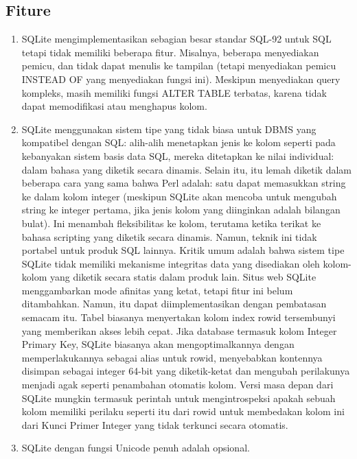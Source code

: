 	\subsection{Fiture}
		\begin{enumerate}
			\item SQLite mengimplementasikan sebagian besar standar SQL-92 untuk SQL tetapi tidak memiliki beberapa fitur. Misalnya, beberapa menyediakan pemicu, dan tidak dapat menulis ke tampilan (tetapi menyediakan pemicu INSTEAD OF yang menyediakan fungsi ini). Meskipun menyediakan query kompleks, masih memiliki fungsi ALTER TABLE terbatas, karena tidak dapat memodifikasi atau menghapus kolom.
			\item SQLite menggunakan sistem tipe yang tidak biasa untuk DBMS yang kompatibel dengan SQL: alih-alih menetapkan jenis ke kolom seperti pada kebanyakan sistem basis data SQL, mereka ditetapkan ke nilai individual: dalam bahasa yang diketik secara dinamis. Selain itu, itu lemah diketik dalam beberapa cara yang sama bahwa Perl adalah: satu dapat memasukkan string ke dalam kolom integer (meskipun SQLite akan mencoba untuk mengubah string ke integer pertama, jika jenis kolom yang diinginkan adalah bilangan bulat). Ini menambah fleksibilitas ke kolom, terutama ketika terikat ke bahasa scripting yang diketik secara dinamis. Namun, teknik ini tidak portabel untuk produk SQL lainnya. Kritik umum adalah bahwa sistem tipe SQLite tidak memiliki mekanisme integritas data yang disediakan oleh kolom-kolom yang diketik secara statis dalam produk lain. Situs web SQLite menggambarkan mode afinitas yang ketat, tetapi fitur ini belum ditambahkan. Namun, itu dapat diimplementasikan dengan pembatasan semacam itu. Tabel biasanya menyertakan kolom index rowid tersembunyi yang memberikan akses lebih cepat. Jika database termasuk kolom Integer Primary Key, SQLite biasanya akan mengoptimalkannya dengan memperlakukannya sebagai alias untuk rowid, menyebabkan kontennya disimpan sebagai integer 64-bit yang diketik-ketat dan mengubah perilakunya menjadi agak seperti penambahan otomatis kolom. Versi masa depan dari SQLite mungkin termasuk perintah untuk mengintrospeksi apakah sebuah kolom memiliki perilaku seperti itu dari rowid untuk membedakan kolom ini dari Kunci Primer Integer yang tidak terkunci secara otomatis.
			\item SQLite dengan fungsi Unicode penuh adalah opsional.

\end{enumerate}
